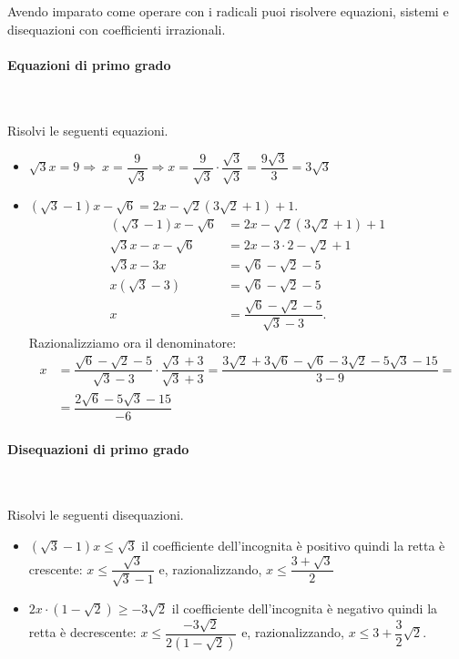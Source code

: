 Avendo imparato come operare con i radicali puoi risolvere equazioni, 
sistemi e disequazioni con coefficienti irrazionali.

\paragraph{Equazioni di primo grado}~

\begin{esempio}{}{}
Risolvi le seguenti equazioni.
\begin{itemize} [left=0mm]
\item 
\(\sqrt{3}x=9\Rightarrow \ x=\dfrac 9{\sqrt{3}} \Rightarrow 
x=\dfrac 9{\sqrt{3}}\cdot \dfrac{\sqrt{3}}{\sqrt{3}}=
  \dfrac{9\sqrt{3}} 3=3\sqrt{3}\)
\item
\((\sqrt{3}-1)x-\sqrt 6=2x-\sqrt{2}(3\sqrt{2}+1)+1\).
\begin{align*}
(\sqrt{3}-1)x-\sqrt 6 &= 2x-\sqrt{2}(3\sqrt{2}+1)+1\\
\sqrt{3}x-x-\sqrt 6 &= 2x-3\cdot 2-\sqrt{2}+1\\
\sqrt{3}x-3x &= \sqrt 6-\sqrt{2}-5\\
x(\sqrt{3}-3) &= \sqrt 6-\sqrt{2}-5\\
x &= \dfrac{\sqrt 6-\sqrt{2}-5}{\sqrt{3}-3}.
\end{align*}
Razionalizziamo ora il denominatore:
\begin{align*}
x &= \dfrac{\sqrt 6-\sqrt{2}-5}{\sqrt{3}-3}\cdot 
     \dfrac{\sqrt{3}+3}{\sqrt{3}+3} =
     \dfrac{3\sqrt{2}+3\sqrt{6}-\sqrt{6}-3\sqrt{2}-5\sqrt{3}-15}{3-9} = \\
&= \dfrac{2\sqrt 6-5\sqrt{3}-15}{-6}
\end{align*}
\end{itemize}
\end{esempio}
% 

\paragraph{Disequazioni di primo grado}~

\begin{esempio}{}{}
Risolvi le seguenti disequazioni.
\begin{itemize}
\item \((\sqrt{3}-1)x \leqslant \sqrt{3}\) il coefficiente dell'incognita è 
positivo quindi la retta è crescente: 
\(x\leqslant \dfrac{\sqrt{3}}{\sqrt{3}-1}\) e, razionalizzando, 
\(x \leqslant \dfrac{3+\sqrt{3}} 2\)
\item \(2x\cdot(1-\sqrt{2}) \geqslant -3\sqrt{2}\) il coefficiente 
dell'incognita è negativo quindi la retta è decrescente: 
\(x \leqslant \dfrac{-3\sqrt{2}}{2(1-\sqrt{2})}\) e, 
razionalizzando, \(x\leqslant 3+\dfrac 3 2\sqrt{2}\).
\end{itemize}

\end{esempio}
% 

